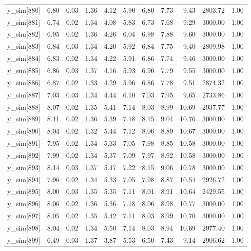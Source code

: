 \begin{table}[ht]
\begin{tabular}{rrrrrrrrrrr}
  y\_sim[880] & 6.80 & 0.03 & 1.36 & 4.12 & 5.90 & 6.80 & 7.73 & 9.43 & 2803.72 & 1.00 \\ 
  y\_sim[881] & 6.74 & 0.02 & 1.34 & 4.08 & 5.83 & 6.73 & 7.68 & 9.29 & 3000.00 & 1.00 \\ 
  y\_sim[882] & 6.95 & 0.02 & 1.36 & 4.26 & 6.04 & 6.98 & 7.88 & 9.60 & 3000.00 & 1.00 \\ 
  y\_sim[883] & 6.84 & 0.03 & 1.34 & 4.20 & 5.92 & 6.84 & 7.75 & 9.40 & 2809.98 & 1.00 \\ 
  y\_sim[884] & 6.83 & 0.02 & 1.34 & 4.22 & 5.91 & 6.86 & 7.74 & 9.46 & 3000.00 & 1.00 \\ 
  y\_sim[885] & 6.86 & 0.03 & 1.37 & 4.16 & 5.93 & 6.90 & 7.79 & 9.55 & 3000.00 & 1.00 \\ 
  y\_sim[886] & 6.87 & 0.02 & 1.33 & 4.29 & 5.96 & 6.86 & 7.78 & 9.51 & 2874.32 & 1.00 \\ 
  y\_sim[887] & 7.03 & 0.03 & 1.34 & 4.44 & 6.10 & 7.03 & 7.95 & 9.65 & 2733.86 & 1.00 \\ 
  y\_sim[888] & 8.07 & 0.02 & 1.35 & 5.41 & 7.14 & 8.03 & 8.99 & 10.69 & 2937.77 & 1.00 \\ 
  y\_sim[889] & 8.11 & 0.02 & 1.36 & 5.39 & 7.18 & 8.15 & 9.04 & 10.76 & 3000.00 & 1.00 \\ 
  y\_sim[890] & 8.04 & 0.02 & 1.32 & 5.44 & 7.12 & 8.06 & 8.89 & 10.67 & 3000.00 & 1.00 \\ 
  y\_sim[891] & 7.95 & 0.02 & 1.34 & 5.33 & 7.05 & 7.98 & 8.85 & 10.58 & 3000.00 & 1.00 \\ 
  y\_sim[892] & 7.99 & 0.02 & 1.34 & 5.37 & 7.09 & 7.97 & 8.92 & 10.58 & 3000.00 & 1.00 \\ 
  y\_sim[893] & 8.14 & 0.03 & 1.37 & 5.47 & 7.22 & 8.15 & 9.06 & 10.78 & 3000.00 & 1.00 \\ 
  y\_sim[894] & 7.96 & 0.02 & 1.34 & 5.33 & 7.05 & 7.98 & 8.87 & 10.54 & 2926.72 & 1.00 \\ 
  y\_sim[895] & 8.00 & 0.03 & 1.35 & 5.35 & 7.11 & 8.01 & 8.91 & 10.64 & 2429.55 & 1.00 \\ 
  y\_sim[896] & 8.06 & 0.02 & 1.36 & 5.36 & 7.18 & 8.06 & 8.98 & 10.77 & 3000.00 & 1.00 \\ 
  y\_sim[897] & 8.05 & 0.02 & 1.35 & 5.42 & 7.11 & 8.03 & 8.99 & 10.70 & 3000.00 & 1.00 \\ 
  y\_sim[898] & 8.04 & 0.02 & 1.34 & 5.50 & 7.14 & 8.03 & 8.94 & 10.69 & 2977.40 & 1.00 \\ 
  y\_sim[899] & 6.49 & 0.03 & 1.37 & 3.87 & 5.53 & 6.50 & 7.43 & 9.14 & 2906.62 & 1.00 \\ 

\end{tabular}
\end{table}
